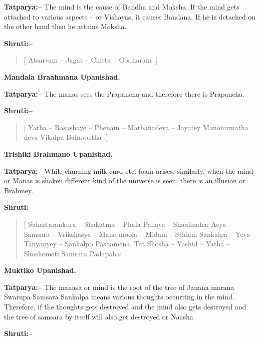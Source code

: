 \textbf{Tatparya:–} The mind is the cause of Bandha and Moksha. If the mind gets attached to various aspects – or Vishayas, it causes Bandana. If he is detached on the other hand then he attains Moksha.

\textbf{Shruti:–}

\begin{verse}
[ Atsarvam – Jagat – Chitta – Godharam .]
\end{verse}

\begin{flushright}
\textbf{Mandala Braahmana Upanishad.}
\end{flushright}

\textbf{Tatparya:–} The manas sees the Prapancha and therefore there is Prapancha.

\textbf{Shruti:–}

\begin{verse}
[ Yatha – Rasashaye – Phenam – Mathanadeva – Jayatey  Manonirmatha deva Vikalpa Bahavastha .]
\end{verse}

\begin{flushright}
\textbf{Trishiki Brahmano Upanishad.}
\end{flushright}

\textbf{Tatparya:–} While churning milk curd etc. foam arises, similarly, when the mind or Manas is shaken different kind of the universe is seen, there is an illusion or Brahmey.

\textbf{Shruti:–}

\begin{verse}
[ Sahastarankura – Shakatma – Phala Pallava – Shaalinaha:  Asya – Samsara – Vrikshasya – Mano moola – Midam – Sthiam  Sankalpa – Yeva – Tanyanyey – Sankalpo Pashamena. Tat Shosha – Yashid – Yatha – Shoshometi Samsara Padapaha: .]
\end{verse}

\begin{flushright}
\textbf{Muktiko Upanishad.}
\end{flushright}

\textbf{Tatparya:–} The manasa or mind is the root of the tree of Janana marana Swarupa Samsara  Sankalpa means various thoughts occurring in the mind. Therefore, if the thoughts gets destroyed and the mind also gets destroyed and the tree of samsara by itself will also get destroyed or Naasha.

\textbf{Shruti:–}

